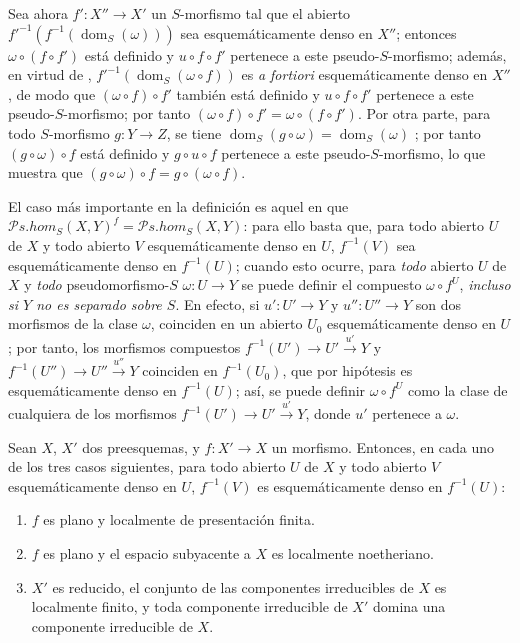 \begin{env}[20.3.3]
\label{IV.20.3.3}
Sea ahora $f':X''\to X'$ un $S$-morfismo tal que el abierto $f'^{-1}(f^{-1}(\operatorname{dom}_S(\omega)))$ sea esquemáticamente denso en $X''$; entonces $\omega\circ(f\circ f')$ está definido y $u\circ f\circ f'$ pertenece a este pseudo-$S$-morfismo; además, en virtud de , $f'^{-1}(\operatorname{dom}_S(\omega\circ f))$ es \emph{a fortiori} esquemáticamente denso en $X''$, de modo que $(\omega\circ f)\circ f'$ también está definido y $u\circ f\circ f'$ pertenece a este pseudo-$S$-morfismo; por tanto $(\omega\circ f)\circ f'=\omega\circ(f\circ f')$.
Por otra parte, para todo $S$-morfismo $g:Y\to Z$, se tiene $\operatorname{dom}_S(g\circ\omega)=\operatorname{dom}_S(\omega)$ ; por tanto $(g\circ\omega)\circ f$ está definido y $g\circ u\circ f$ pertenece a este pseudo-$S$-morfismo, lo que muestra que $(g\circ\omega)\circ f=g\circ(\omega\circ f)$.
\end{env}

\begin{env}[20.3.4]
\label{IV.20.3.4}
El caso más importante en la definición  es aquel en que $\mathscr{P}\!s.\mathit{hom}_S(X,Y)^f=\mathscr{P}\!s.\mathit{hom}_S(X,Y)$: para ello basta que, para todo abierto $U$ de $X$ y todo abierto $V$ esquemáticamente denso en $U$, $f^{-1}(V)$ sea esquemáticamente denso en $f^{-1}(U)$; cuando esto ocurre, para \emph{todo} abierto $U$ de $X$ y \emph{todo} pseudomorfismo-$S$ $\omega:U\to Y$ se puede definir el compuesto $\omega\circ f^U$, \emph{incluso si $Y$ no es separado sobre $S$}.
En efecto, si $u':U'\to Y$ y $u'':U''\to Y$ son dos morfismos de la clase $\omega$, coinciden en un abierto $U_0$ esquemáticamente denso en $U$; por tanto, los morfismos compuestos $f^{-1}(U')\to U'\xrightarrow{u'}Y$ y $f^{-1}(U'')\to U''\xrightarrow{u''}Y$ coinciden en $f^{-1}(U_0)$, que por hipótesis es esquemáticamente denso en $f^{-1}(U)$; así, se puede definir $\omega\circ f^U$ como la clase de cualquiera de los morfismos $f^{-1}(U')\to U'\xrightarrow{u'}Y$, donde $u'$ pertenece a $\omega$.
\end{env}

\begin{proposition}[20.3.5]
\label{IV.20.3.5}
Sean $X$, $X'$ dos preesquemas, y $f:X'\to X$ un morfismo.
Entonces, en cada uno de los tres casos siguientes, para todo abierto $U$ de $X$ y todo abierto $V$ esquemáticamente denso en $U$, $f^{-1}(V)$ es esquemáticamente denso en $f^{-1}(U)$:
\begin{enumerate}[label=\emph{(\roman*)}]
  \item $f$ es plano y localmente de presentación finita.
  \item $f$ es plano y el espacio subyacente a $X$ es localmente noetheriano.
  \item $X'$ es reducido, el conjunto de las componentes irreducibles de $X$ es localmente finito, y toda componente irreducible de $X'$ domina una componente irreducible de $X$.
\end{enumerate}
\end{proposition}

